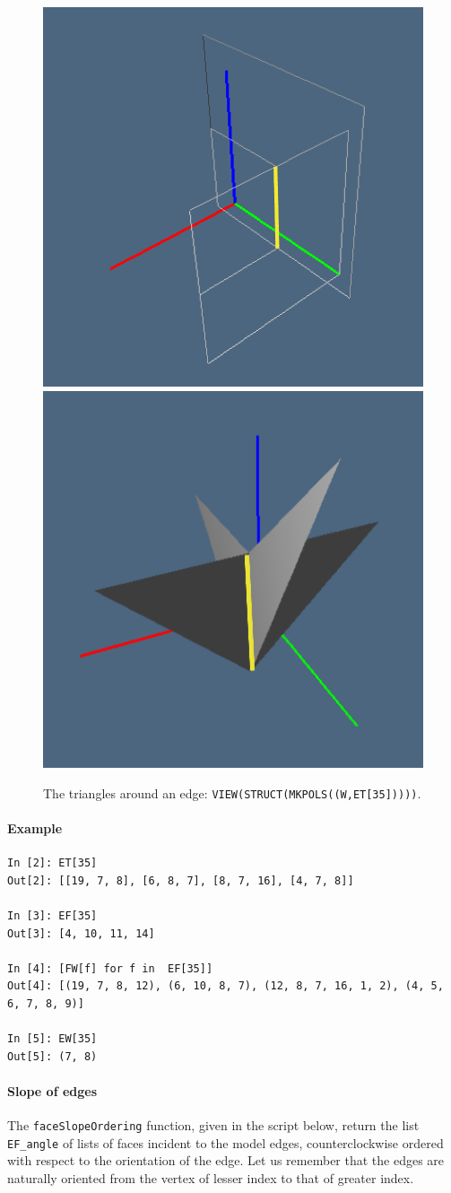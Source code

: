 \documentclass[11pt,oneside]{article}    %
\begin{document}
\begin{figure}[htbp] %
   \centering
   \includegraphics[height=0.325\linewidth,width=0.325\linewidth]{images/edgeTriangles1} 
   \includegraphics[height=0.325\linewidth,width=0.325\linewidth]{images/edgeTriangles} 
   \caption{The triangles around an edge: \texttt{VIEW(STRUCT(MKPOLS((W,ET[35]))))}.}
   \label{fig:3Dtriangulation}
\end{figure}

\paragraph{Example}

{\small
\begin{verbatim}
In [2]: ET[35]
Out[2]: [[19, 7, 8], [6, 8, 7], [8, 7, 16], [4, 7, 8]]

In [3]: EF[35]
Out[3]: [4, 10, 11, 14]

In [4]: [FW[f] for f in  EF[35]]
Out[4]: [(19, 7, 8, 12), (6, 10, 8, 7), (12, 8, 7, 16, 1, 2), (4, 5, 6, 7, 8, 9)]

In [5]: EW[35]
Out[5]: (7, 8)
\end{verbatim}}



\paragraph{Slope of edges}

The \texttt{faceSlopeOrdering} function, given in the script below, return the list \texttt{EF\_angle} of lists of faces incident to the model edges, counterclockwise ordered with respect to the orientation of the edge. Let us remember that the edges are naturally oriented from the vertex of lesser index to that of greater index.
\end{document}
